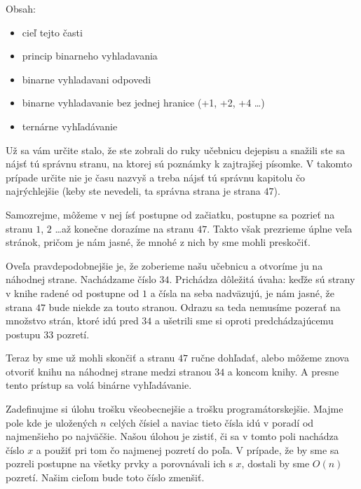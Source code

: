 




Obsah:
\begin{itemize}
    \item cieľ tejto časti
    \item princip binarneho vyhladavania
    \item binarne vyhladavani odpovedi
    \item binarne vyhladavanie bez jednej hranice (+1, +2, +4 \dots)
    \item ternárne vyhľadávanie
\end{itemize}

Už sa vám určite stalo, že ste zobrali do ruky učebnicu dejepisu a snažili ste sa nájsť tú správnu stranu, na
ktorej sú poznámky k zajtrajšej písomke. V takomto prípade určite nie je času nazvyš a treba nájsť
tú správnu kapitolu čo najrýchlejšie (keby ste nevedeli, ta správna strana je strana $47$).

Samozrejme, môžeme v nej ísť postupne od začiatku, postupne sa pozrieť na stranu $1$, $2$ \dots až
konečne dorazíme na stranu $47$. Takto však prezrieme úplne veľa stránok, pričom je nám jasné, že
mnohé z nich by sme mohli preskočiť.

Oveľa pravdepodobnejšie je, že zoberieme našu učebnicu a otvoríme ju na náhodnej strane. Nachádzame
číslo $34$. Prichádza dôležitá úvaha: keďže sú strany v knihe radené od postupne od $1$ a čísla na
seba nadväzujú, je nám jasné, že strana $47$ bude niekde za touto stranou. Odrazu sa teda nemusíme
pozerať na množstvo strán, ktoré idú pred $34$ a ušetrili sme si oproti predchádzajúcemu postupu
$33$ pozretí.

Teraz by sme už mohli skončiť a stranu $47$ ručne dohľadať, alebo môžeme znova otvoriť knihu na
náhodnej strane medzi stranou $34$ a koncom knihy. A presne tento prístup sa volá binárne
vyhľadávanie.

\medskip

Zadefinujme si úlohu trošku všeobecnejšie a trošku programátorskejšie. Majme pole kde je uložených
$n$ celých čísiel a naviac tieto čísla idú v poradí od najmenšieho po najväčšie. Našou úlohou je
zistiť, či sa v tomto poli nachádza číslo $x$ a použiť pri tom čo najmenej pozretí do poľa. V
prípade, že by sme sa pozreli postupne na všetky prvky a porovnávali ich s $x$, dostali by sme
$O(n)$ pozretí. Našim cieľom bude toto číslo zmenšiť.

